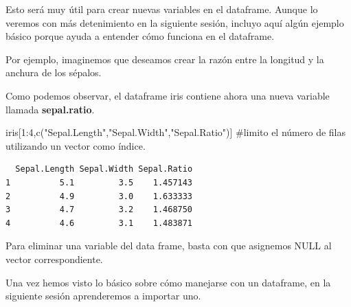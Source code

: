 \documentclass[
  letterpaper,
  DIV=11,
  numbers=noendperiod]{scrreprt}
\newenvironment{Shaded}{\begin{snugshade}}{\end{snugshade}}
\newcommand{\CommentTok}[1]{\textcolor[rgb]{0.37,0.37,0.37}{#1}}
\newcommand{\ConstantTok}[1]{\textcolor[rgb]{0.56,0.35,0.01}{#1}}
\newcommand{\DecValTok}[1]{\textcolor[rgb]{0.68,0.00,0.00}{#1}}
\newcommand{\FunctionTok}[1]{\textcolor[rgb]{0.28,0.35,0.67}{#1}}
\newcommand{\NormalTok}[1]{\textcolor[rgb]{0.00,0.23,0.31}{#1}}
\newcommand{\OtherTok}[1]{\textcolor[rgb]{0.00,0.23,0.31}{#1}}
\newcommand{\SpecialCharTok}[1]{\textcolor[rgb]{0.37,0.37,0.37}{#1}}
\newcommand{\StringTok}[1]{\textcolor[rgb]{0.13,0.47,0.30}{#1}}
\begin{document}
Esto será muy útil para crear nuevas variables en el dataframe. Aunque
lo veremos con más detenimiento en la siguiente sesión, incluyo aquí
algún ejemplo básico porque ayuda a entender cómo funciona en el
dataframe.

Por ejemplo, imaginemos que deseamos crear la razón entre la longitud y
la anchura de los sépalos.

\begin{Shaded}
\end{Shaded}

Como podemos observar, el dataframe iris contiene ahora una nueva
variable llamada \textbf{sepal.ratio}.

\begin{Shaded}
\begin{Highlighting}[]
\NormalTok{iris[}\DecValTok{1}\SpecialCharTok{:}\DecValTok{4}\NormalTok{,}\FunctionTok{c}\NormalTok{(}\StringTok{"Sepal.Length"}\NormalTok{,}\StringTok{"Sepal.Width"}\NormalTok{,}\StringTok{"Sepal.Ratio"}\NormalTok{)] }\CommentTok{\#limito el número de filas utilizando un vector como índice.}
\end{Highlighting}
\end{Shaded}

\begin{verbatim}
  Sepal.Length Sepal.Width Sepal.Ratio
1          5.1         3.5    1.457143
2          4.9         3.0    1.633333
3          4.7         3.2    1.468750
4          4.6         3.1    1.483871
\end{verbatim}

Para eliminar una variable del data frame, basta con que asignemos NULL
al vector correspondiente.

\begin{Shaded}
\end{Shaded}

Una vez hemos visto lo básico sobre cómo manejarse con un dataframe, en
la siguiente sesión aprenderemos a importar uno.
\end{document}
